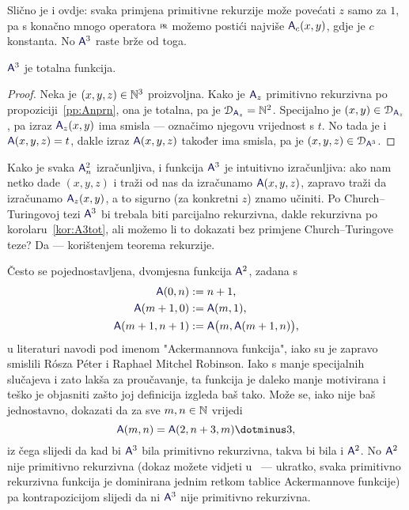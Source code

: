 Slično je i ovdje: svaka primjena primitivne rekurzije može povećati $z$ samo za $1$, pa s konačno mnogo operatora $\pr$ možemo postići najviše $\f A_c(x,y)$, gdje je $c$ konstanta. No $\f A^3$ raste brže od toga.

\begin{korolar}[{name=[totalnost Ackermannove funkcije]}]\label{kor:A3tot}
$\f A^3$ je totalna funkcija.
\end{korolar}
\begin{proof}
Neka je $(x,y,z)\in{\mathbb N}^3$ proizvoljna. Kako je $\f A_z$ primitivno rekurzivna po propoziciji~\ref{pp:Anprn}, ona je totalna, pa je $\dom{\f A_z}=\N^2$. Specijalno je $(x,y)\in\dom{\f A_z}$, pa izraz $\f A_z(x,y)$ ima smisla --- označimo njegovu vrijednost s $t$. No tada je i $\f A(x,y,z)=t$, dakle izraz $\f A(x,y,z)$ također ima smisla, pa je $(x,y,z)\in\dom{\f A^3}$.
\end{proof}

Kako je svaka $\f A_n^2$ izračunljiva, i funkcija $\f A^3$ je intuitivno izračunljiva: ako nam netko dade $(x,y,z)$ i traži od nas da izračunamo $\f A(x,y,z)$, zapravo traži da izračunamo $\f A_z(x,y)$, a to sigurno (za konkretni $z$) znamo učiniti. Po Church--\!Turingovoj tezi $\f A^3$ bi trebala biti parcijalno rekurzivna, dakle rekurzivna po korolaru~\ref{kor:A3tot}, ali možemo li to dokazati bez primjene Church--\!Turingove teze? Da --- korištenjem teorema rekurzije.

\begin{napomena}[{name=[dvomjesna Ackermannova funkcija]}]
Često se pojednostavljena, dvomjesna funkcija $\f A^2$, zadana s
\begin{align}
    \f A(0,n)&:=n+1\text,\\
    \f A(m+1,0)&:=\f A(m,1)\text,\\
    \f A(m+1,n+1)&:=\f A\bigl(m,\f A(m+1,n)\bigr)\text,
\end{align}
u literaturi navodi pod imenom "Ackermannova funkcija", iako su je zapravo smislili R\'osza P\'eter i Raphael Mitchel Robinson. Iako s manje specijalnih slučajeva i zato lakša za proučavanje, ta funkcija je daleko manje motivirana i teško je objasniti zašto joj definicija izgleda baš tako. Može se, iako nije baš jednostavno, dokazati da za sve $m,n\in{\mathbb N}$ vrijedi
\begin{equation}
    \f A(m,n)=\f A(2,n+3,m)\dotminus3\text,
\end{equation}
	iz čega slijedi da kad bi $\f A^3$ bila primitivno rekurzivna, takva bi bila i $\f A^2$. No $\f A^2$ nije primitivno rekurzivna (dokaz možete vidjeti u~\cite[dodatak]{skr:Vuk} --- ukratko, svaka primitivno rekurzivna funkcija je dominirana jednim retkom tablice Ackermannove funkcije) pa kontrapozicijom slijedi da ni $\f A^3$ nije primitivno rekurzivna.
\end{napomena}

